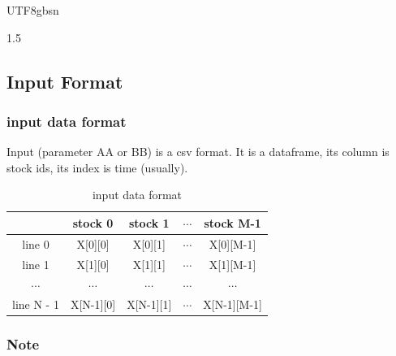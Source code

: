 \documentclass{article}
\begin{document}
\begin{CJK}{UTF8}{gbsn}
\begin{spacing}{1.5}
\subsection{Input Format}
\label{subsec:input}

\subsubsection{input data format}

Input (parameter AA or BB) is a csv format. It is a dataframe, its column is stock ids, its index is time (usually).
\begin{table}[htbp]
\centering
\caption{input data format}
\begin{tabular}{ccccc}%

            & stock 0   &  stock 1  &   $\cdots$    &  stock M-1  \\ \hline 
line 0      &X[0][0]    & X[0][1] &   $\cdots$    &X[0][M-1]  \\  
line 1      &X[1][0]    & X[1][1] &   $\cdots$    &X[1][M-1]  \\  
$\cdots$    & $\cdots$  & $\cdots$     &   $\cdots$    &  $\cdots$      \\  
line N - 1  &X[N-1][0]  &X[N-1][1]&   $\cdots$    &X[N-1][M-1]\\  

\end{tabular}
\end{table}


\subsubsection{Note }



\end{spacing}
\end{CJK}
\end{document}
